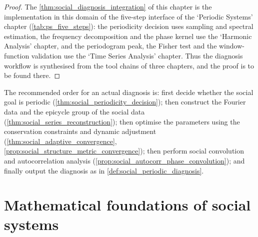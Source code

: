 \begin{proof}
The \cref{thm:social_diagnosis_integration} of this chapter is the implementation in this domain of the five-step interface of the `Periodic Systems' chapter (\cref{tab:ps_five_steps}):
the periodicity decision uses sampling and spectral estimation, the frequency decomposition and the phase kernel use the `Harmonic Analysis' chapter, and the periodogram peak, the Fisher test and the
window-function validation use the `Time Series Analysis' chapter. Thus the diagnosis workflow is synthesised from the tool chains of three chapters, and the proof is to be found there.
\end{proof}

\begin{remark}\label{rem:social_integration_order}
The recommended order for an actual diagnosis is: first decide whether the social goal is periodic (\cref{thm:social_periodicity_decision}); then construct the Fourier data and the epicycle group of the social data (\cref{thm:social_series_reconstruction}); then optimise the parameters using the conservation constraints and dynamic adjustment (\cref{thm:social_adaptive_convergence}, \cref{prop:social_structure_metric_convergence}); then perform social convolution and autocorrelation analysis (\cref{prop:social_autocorr_phase_convolution}); and finally output the diagnosis as in \cref{def:social_periodic_diagnosis}.
\end{remark}

\section{Mathematical foundations of social systems}

